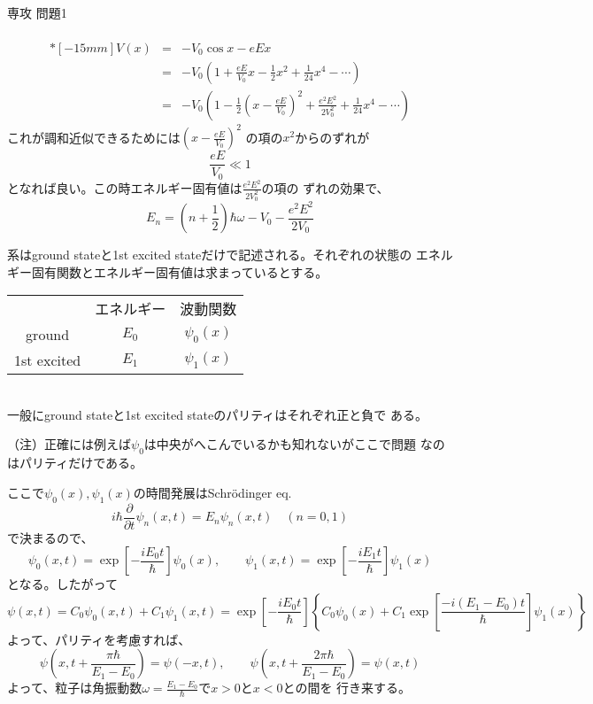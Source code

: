 \documentclass[fleqn]{jbook}
\begin{document}
\begin{answer}{専攻 問題1}{}
\begin{subanswers}
\begin{subsubanswers}
\SubSubAnswer
\begin{eqnarray*}
&&\\*[-15mm]
V(x)&=&-V_{0}\cos x-eEx\\
&=&-V_{0}\left(1+\frac{eE}{V_{0}}x-\frac{1}{2}x^{2}+
\frac{1}{24}x^{4}-\cdots\right)\\
&=&-V_{0}\left(1-\frac{1}{2}\left(x-\frac{eE}{V_{0}}\right)^{2}
+\frac{e^{2}E^{2}}{2V_{0}^{2}}+
\frac{1}{24}x^{4}-\cdots\right)
\end{eqnarray*}
これが調和近似できるためには$\left(x-\frac{eE}{V_{0}}\right)^{2}$
の項の$x^{2}$からのずれが
\begin{displaymath}
\frac{eE}{V_{0}} \ll 1
\end{displaymath}
となれば良い。この時エネルギー固有値は$\displaystyle{
\frac{e^{2}E^{2}}{2V_{0}^{2}}}$の項の
ずれの効果で、
\begin{displaymath}
E_{n}=\left(n+\frac{1}{2}\right)\hbar\omega-V_{0}-\frac{e^{2}E^{2}}{2V_{0}}
\end{displaymath}

\end{subsubanswers}

%

\SubAnswer
系はground stateと1st excited stateだけで記述される。それぞれの状態の
エネルギー固有関数とエネルギー固有値は求まっているとする。\\
\begin{tabular}{ccc}
{ } & {エネルギー} & {波動関数}\\
ground & $E_{0}$ & $\psi_{0}(x)$\\
1st excited & $E_{1}$ & $\psi_{1}(x)$
\end{tabular}\\
一般にground stateと1st excited stateのパリティはそれぞれ正と負で
ある。

（注）正確には例えば$\psi_{0}$は中央がへこんでいるかも知れないがここで問題
なのはパリティだけである。

ここで$\psi_{0}(x),\psi_{1}(x)$の時間発展はSchr\"{o}dinger eq.
\begin{displaymath}
i\hbar\frac{\partial}{\partial t}\psi_{n}(x,t)=E_{n}\psi_{n}(x,t)\quad (n=0,1)
\end{displaymath}
で決まるので、
\[
\psi_{0}(x,t)=\exp\left[-\frac{iE_{0}t}{\hbar}\right]\psi_{0}(x), 
\qquad
\psi_{1}(x,t)=\exp\left[-\frac{iE_{1}t}{\hbar}\right]\psi_{1}(x)
\]
となる。したがって
\[
\psi(x,t)=C_0\psi_{0}(x,t)+C_1\psi_{1}(x,t)=\exp\left[-\frac{iE_{0}t}{\hbar}\right]\left\{C_0\psi_{0}(x)+C_1\exp\left[\frac{-i(E_{1}-E_{0})t}{\hbar}\right]\psi_{1}(x)\right\}
\]
よって、パリティを考慮すれば、
\[
\psi(x,t+\frac{\pi\hbar}{E_1-E_0}) = \psi(-x,t), \qquad
\psi(x,t+\frac{2\pi\hbar}{E_1-E_0})= \psi(x,t)
\]
よって、粒子は角振動数$\displaystyle{\omega=
\frac{E_{1}-E_{0}}{\hbar}}$で$x>0$と$x<0$との間を
行き来する。

\end{subanswers}

\end{answer}
\end{document}
